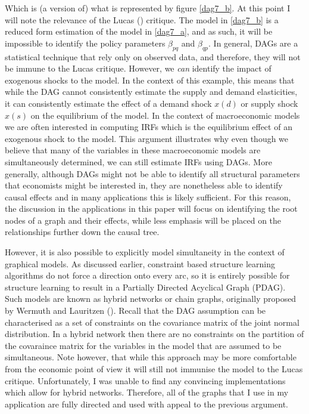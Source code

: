 \documentclass{article}
\begin{document}
Which is (a version of) what is represented by figure \ref{dag7_b}. At this point I will note the relevance of the Lucas (\citeyear{lucas1976econometric}) critique. The model in \ref{dag7_b} is a reduced form estimation of the model in \ref{dag7_a}, and as such, it will be impossible to identify the policy parameters $\beta_{pq}$ and $\beta_{qp}$. In general, DAGs are a statistical technique that rely only on observed data, and therefore, they will not be immune to the Lucas critique. However, we \textit{can} identify the impact of exogenous shocks to the model. In the context of this example, this means that while the DAG cannot consistently estimate the supply and demand elasticities, it can consistently estimate the effect of a demand shock $x(d)$ or supply shock $x(s)$ on the equilibrium of the model. In the context of macroeconomic models we are often interested in computing IRFs which is the equilibrium effect of an exogenous shock to the model. This argument illustrates why even though we believe that many of the variables in these macroeconomic models are simultaneously determined, we can still estimate IRFs using DAGs. More generally, although DAGs might not be able to identify all structural parameters that economists might be interested in, they are nonetheless able to identify causal effects and in many applications this is likely sufficient. For this reason, the discussion in the applications in this paper will focus on identifying the root nodes of a graph and their effects, while less emphasis will be placed on the relationships further down the causal tree.

However, it is also possible to explicitly model simultaneity in the context of graphical models. As discussed earlier, constraint based structure learning algorithms do not force a direction onto every arc, so it is entirely possible for structure learning to result in a Partially Directed Acyclical Graph (PDAG). Such models are known as hybrid networks or chain graphs, originally proposed by Wermuth and Lauritzen (\citeyear{wermuth1990substantive}). Recall that the DAG assumption can be characterised as a set of constraints on the covariance matrix of the joint normal distribution. In a hybrid network then there are no constraints on the partition of the covaraince matrix for the variables in the model that are assumed to be simultaneous. Note however, that while this approach may be more comfortable from the economic point of view it will still not immunise the model to the Lucas critique. Unfortunately, I was unable to find any convincing implementations which allow for hybrid networks. Therefore, all of the graphs that I use in my application are fully directed and used with appeal to the previous argument.
\end{document}

